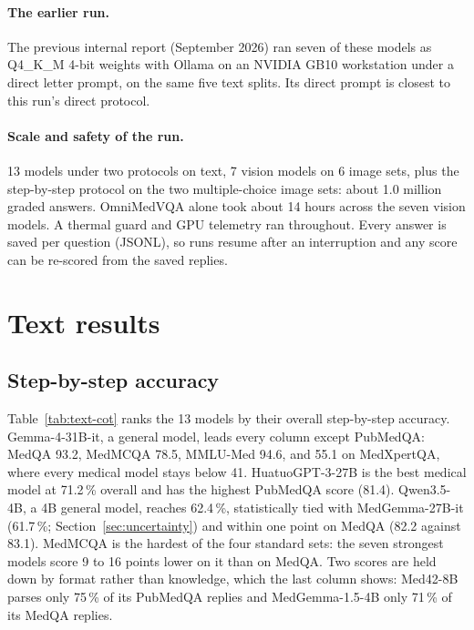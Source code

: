\documentclass{article}
\newcommand{\pct}{\,\%}
\begin{document}
\paragraph{The earlier run.} The previous internal report (September 2026) ran seven of these models as Q4\_K\_M 4-bit weights with Ollama on an NVIDIA GB10 workstation under a direct letter prompt, on the same five text splits. Its direct prompt is closest to this run's direct protocol.

\paragraph{Scale and safety of the run.} 13 models under two protocols on text, 7 vision models on 6 image sets, plus the step-by-step protocol on the two multiple-choice image sets: about 1.0 million graded answers. OmniMedVQA alone took about 14 hours across the seven vision models. A thermal guard and GPU telemetry ran throughout. Every answer is saved per question (JSONL), so runs resume after an interruption and any score can be re-scored from the saved replies.

\section{Text results}
\label{sec:text}

\subsection{Step-by-step accuracy}

Table~\ref{tab:text-cot} ranks the 13 models by their overall step-by-step accuracy. Gemma-4-31B-it, a general model, leads every column except PubMedQA: MedQA 93.2, MedMCQA 78.5, MMLU-Med 94.6, and 55.1 on MedXpertQA, where every medical model stays below 41. HuatuoGPT-3-27B is the best medical model at 71.2\pct{} overall and has the highest PubMedQA score (81.4). Qwen3.5-4B, a 4B general model, reaches 62.4\pct{}, statistically tied with MedGemma-27B-it (61.7\pct{}; Section~\ref{sec:uncertainty}) and within one point on MedQA (82.2 against 83.1). MedMCQA is the hardest of the four standard sets: the seven strongest models score 9 to 16 points lower on it than on MedQA. Two scores are held down by format rather than knowledge, which the last column shows: Med42-8B parses only 75\pct{} of its PubMedQA replies and MedGemma-1.5-4B only 71\pct{} of its MedQA replies.
\end{document}
